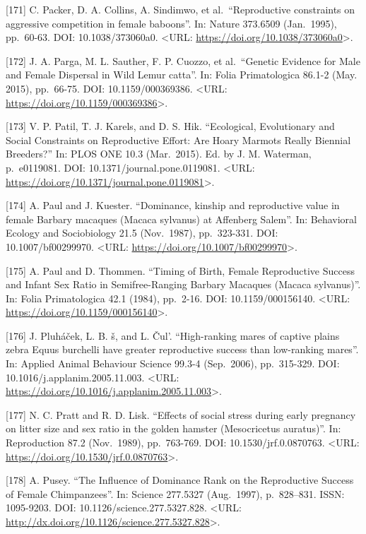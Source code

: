 \documentclass[
]{article}
\begin{document}
{[}171{]} C. Packer, D. A. Collins, A. Sindimwo, et al.~``Reproductive
constraints on aggressive competition in female baboons''. In: Nature
373.6509 (Jan.~1995), pp.~60-63. DOI: 10.1038/373060a0. \textless URL:
\url{https://doi.org/10.1038/373060a0}\textgreater.

{[}172{]} J. A. Parga, M. L. Sauther, F. P. Cuozzo, et al.~``Genetic
Evidence for Male and Female Dispersal in Wild Lemur catta''. In: Folia
Primatologica 86.1-2 (May. 2015), pp.~66-75. DOI: 10.1159/000369386.
\textless URL: \url{https://doi.org/10.1159/000369386}\textgreater.

{[}173{]} V. P. Patil, T. J. Karels, and D. S. Hik. ``Ecological,
Evolutionary and Social Constraints on Reproductive Effort: Are Hoary
Marmots Really Biennial Breeders?'' In: PLOS ONE 10.3 (Mar.~2015). Ed.
by J. M. Waterman, p.~e0119081. DOI: 10.1371/journal.pone.0119081.
\textless URL:
\url{https://doi.org/10.1371/journal.pone.0119081}\textgreater.

{[}174{]} A. Paul and J. Kuester. ``Dominance, kinship and reproductive
value in female Barbary macaques (Macaca sylvanus) at Affenberg Salem''.
In: Behavioral Ecology and Sociobiology 21.5 (Nov.~1987), pp.~323-331.
DOI: 10.1007/bf00299970. \textless URL:
\url{https://doi.org/10.1007/bf00299970}\textgreater.

{[}175{]} A. Paul and D. Thommen. ``Timing of Birth, Female Reproductive
Success and Infant Sex Ratio in Semifree-Ranging Barbary Macaques
(Macaca sylvanus)''. In: Folia Primatologica 42.1 (1984), pp.~2-16. DOI:
10.1159/000156140. \textless URL:
\url{https://doi.org/10.1159/000156140}\textgreater.

{[}176{]} J. Pluháček, L. B. š, and L. Čul'. ``High-ranking mares of
captive plains zebra Equus burchelli have greater reproductive success
than low-ranking mares''. In: Applied Animal Behaviour Science 99.3-4
(Sep.~2006), pp.~315-329. DOI: 10.1016/j.applanim.2005.11.003.
\textless URL:
\url{https://doi.org/10.1016/j.applanim.2005.11.003}\textgreater.

{[}177{]} N. C. Pratt and R. D. Lisk. ``Effects of social stress during
early pregnancy on litter size and sex ratio in the golden hamster
(Mesocricetus auratus)''. In: Reproduction 87.2 (Nov.~1989),
pp.~763-769. DOI: 10.1530/jrf.0.0870763. \textless URL:
\url{https://doi.org/10.1530/jrf.0.0870763}\textgreater.

{[}178{]} A. Pusey. ``The Influence of Dominance Rank on the
Reproductive Success of Female Chimpanzees''. In: Science 277.5327
(Aug.~1997), p.~828--831. ISSN: 1095-9203. DOI:
10.1126/science.277.5327.828. \textless URL:
\url{http://dx.doi.org/10.1126/science.277.5327.828}\textgreater.
\end{document}
